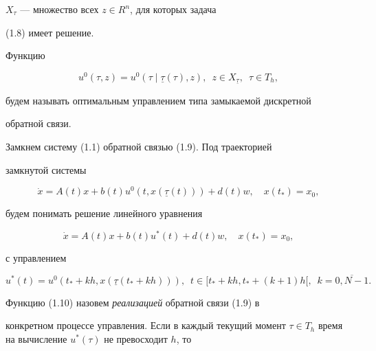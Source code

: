 $X_{\tau}$ --- множество всех $z \in R^n$, для которых задача


(1.8) имеет решение.





\begin{defns}


Функцию


\begin{equation}


u^0(\tau,z)=u^0(\tau \mid \underline{\tau}(\tau),z),\ \; z \in


X_{\underline{\tau}},\ \; \tau \in T_{h},


\end{equation}


будем называть оптимальным управлением типа замыкаемой дискретной


обратной связи.


\end{defns}





Замкнем систему (1.1) обратной связью (1.9). Под траекторией


замкнутой системы


$$


\Dot x =A(t)x+b(t)u^0(t,x(\underline{\tau}(t)))+d(t)w,\quad x(t_*)=x_0,


$$


будем понимать решение линейного уравнения


$$


\Dot x =A(t)x+b(t)u^*(t)+d(t)w,\quad x(t_*)=x_0,


$$


с управлением


\begin{equation}


u^*(t)=u^0(t_*+kh,x(\underline{\tau}(t_*+kh))),\ \; t \in


[t_*+kh,t_*+(k+1)h[,\ \; k=\overline{0,N-1}.


\end{equation}





Функцию (1.10) назовем {\it реализацией} обратной связи (1.9) в


конкретном процессе управления. Если в каждый текущий момент $\tau


\in T_h$ время на вычисление $u^*(\tau)$ не превосходит $h$, то


